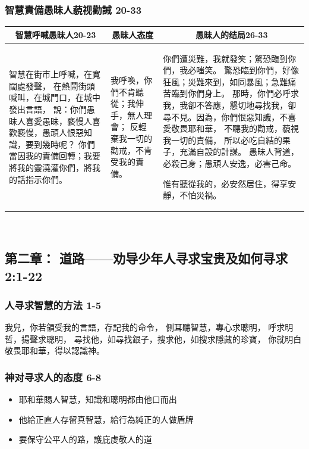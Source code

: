 \subsubsection{智慧責備愚昧人藐视勸誡 20-33}
\begin{table}[H]
\centering
\begin{tabular}{p{5.25cm}|p{2.500cm}|p{9.500cm}}\hline\hline
\multicolumn{1}{c|}{智慧呼喊愚昧人20-23}&\multicolumn{1}{c|}{愚昧人态度}&\multicolumn{1}{c}{愚昧人的结局26-33}\\\hline
智慧在街市上呼喊，在寬闊處發聲，
在熱鬧街頭喊叫，在城門口，在城中發出言語，
說：你們愚昧人喜愛愚昧，褻慢人喜歡褻慢，愚頑人恨惡知識，要到幾時呢？
你們當因我的責備回轉；我要將我的靈澆灌你們，將我的話指示你們。
&我呼喚，你們不肯聽從；我伸手，無人理會；
反輕棄我一切的勸戒，不肯受我的責備。

&你們遭災難，我就發笑；驚恐臨到你們，我必嗤笑。
驚恐臨到你們，好像狂風；災難來到，如同暴風；急難痛苦臨到你們身上。
那時，你們必呼求我，我卻不答應，懇切地尋找我，卻尋不見。因為，你們恨惡知識，不喜愛敬畏耶和華，
不聽我的勸戒，藐視我一切的責備，
所以必吃自結的果子，充滿自設的計謀。
愚昧人背道，必殺己身；愚頑人安逸，必害己命。

惟有聽從我的，必安然居住，得享安靜，不怕災禍。\\\hline
\end{tabular}
\end{table} 


\subsection{第二章： 道路——劝导少年人寻求宝贵及如何寻求  2:1-22}
\subsubsection{人寻求智慧的方法 1-5}
我兒，你若領受我的言語，存記我的命令，
側耳聽智慧，專心求聰明，
呼求明哲，揚聲求聰明，
尋找他，如尋找銀子，搜求他，如搜求隱藏的珍寶，
你就明白敬畏耶和華，得以認識神。


\subsubsection{神对寻求人的态度 6-8}
\begin{itemize}
\itemsep-.45em  
\item 耶和華賜人智慧，知識和聰明都由他口而出
\item 他給正直人存留真智慧，給行為純正的人做盾牌
\item 要保守公平人的路，護庇虔敬人的道
\end{itemize}
